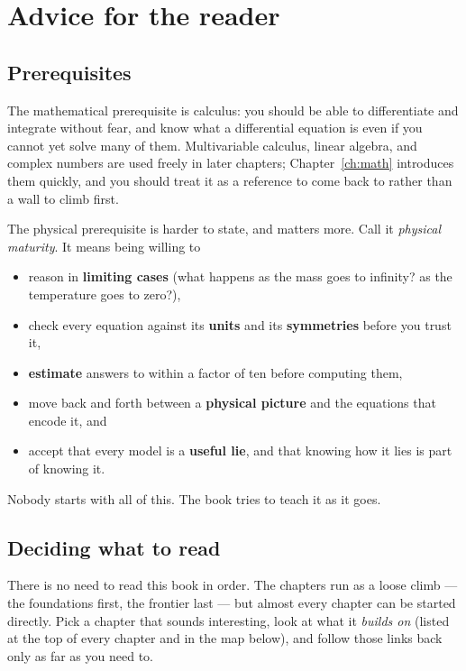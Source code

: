 \chapter{Advice for the reader}

\section*{Prerequisites}

The mathematical prerequisite is calculus: you should be able to differentiate and integrate without fear, and know what a differential equation is even if you cannot yet solve many of them. Multivariable calculus, linear algebra, and complex numbers are used freely in later chapters; Chapter~\ref{ch:math} introduces them quickly, and you should treat it as a reference to come back to rather than a wall to climb first.

The physical prerequisite is harder to state, and matters more. Call it \emph{physical maturity}. It means being willing to
\begin{itemize}[itemsep=2pt]
  \item reason in \textbf{limiting cases} (what happens as the mass goes to infinity? as the temperature goes to zero?),
  \item check every equation against its \textbf{units} and its \textbf{symmetries} before you trust it,
  \item \textbf{estimate} answers to within a factor of ten before computing them,
  \item move back and forth between a \textbf{physical picture} and the equations that encode it, and
  \item accept that every model is a \textbf{useful lie}, and that knowing how it lies is part of knowing it.
\end{itemize}
Nobody starts with all of this. The book tries to teach it as it goes.

\section*{Deciding what to read}

There is no need to read this book in order. The chapters run as a loose climb --- the foundations first, the frontier last --- but almost every chapter can be started directly. Pick a chapter that sounds interesting, look at what it \emph{builds on} (listed at the top of every chapter and in the map below), and follow those links back only as far as you need to.

